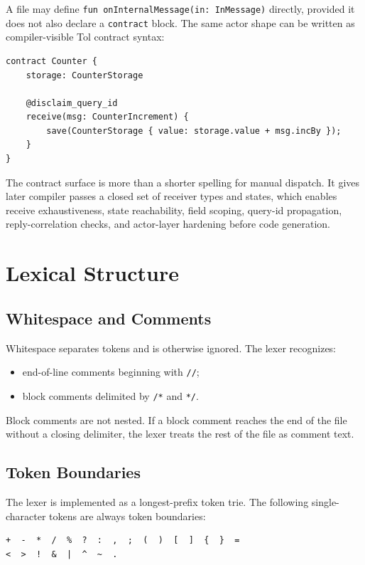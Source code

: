 \documentclass[12pt,oneside]{article}
\begin{document}
A file may define \verb|fun onInternalMessage(in: InMessage)| directly,
provided it does not also declare a \verb|contract| block. The same actor shape
can be written as compiler-visible Tol contract syntax:

\begin{verbatim}
contract Counter {
    storage: CounterStorage

    @disclaim_query_id
    receive(msg: CounterIncrement) {
        save(CounterStorage { value: storage.value + msg.incBy });
    }
}
\end{verbatim}

The contract surface is more than a shorter spelling for manual dispatch. It
gives later compiler passes a closed set of receiver types and states, which
enables receive exhaustiveness, state reachability, field scoping, query-id
propagation, reply-correlation checks, and actor-layer hardening before code
generation.

\section{Lexical Structure}
\subsection{Whitespace and Comments}
Whitespace separates tokens and is otherwise ignored. The lexer recognizes:

\begin{itemize}
\item end-of-line comments beginning with \verb|//|;
\item block comments delimited by \verb|/*| and \verb|*/|.
\end{itemize}

Block comments are not nested. If a block comment reaches the end of the file
without a closing delimiter, the lexer treats the rest of the file as comment
text.

\subsection{Token Boundaries}
The lexer is implemented as a longest-prefix token trie. The following
single-character tokens are always token boundaries:

\begin{verbatim}
+  -  *  /  %  ?  :  ,  ;  (  )  [  ]  {  }  =
<  >  !  &  |  ^  ~  .
\end{verbatim}
\end{document}
